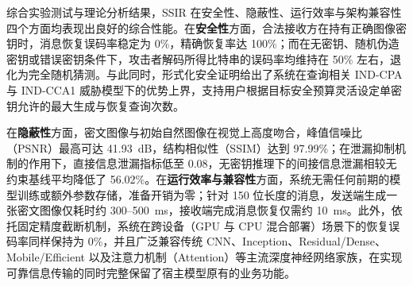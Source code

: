 综合实验测试与理论分析结果，SSIR 在安全性、隐蔽性、运行效率与架构兼容性四个方面均表现出良好的综合性能。在\textbf{安全性}方面，合法接收方在持有正确图像密钥时，消息恢复误码率稳定为 0\%，精确恢复率达 100\%；而在无密钥、随机伪造密钥或错误密钥条件下，攻击者解码所得比特串的误码率均维持在 50\% 左右，退化为完全随机猜测。与此同时，形式化安全证明给出了系统在查询相关 IND-CPA 与 IND-CCA1 威胁模型下的优势上界，支持用户根据目标安全预算灵活设定单密钥允许的最大生成与恢复查询次数。

在\textbf{隐蔽性}方面，密文图像与初始自然图像在视觉上高度吻合，峰值信噪比（PSNR）最高可达 41.93~dB，结构相似性（SSIM）达到 97.99\%；在泄漏抑制机制的作用下，直接信息泄漏指标低至 0.08，无密钥推理下的间接信息泄漏相较无约束基线平均降低了 56.02\%。在\textbf{运行效率与兼容性}方面，系统无需任何前期的模型训练或额外参数存储，准备开销为零；针对 150 位长度的消息，发送端生成一张密文图像仅耗时约 300--500~ms，接收端完成消息恢复仅需约 10~ms。此外，依托固定精度截断机制，系统在跨设备（GPU 与 CPU 混合部署）场景下的恢复误码率同样保持为 0\%，并且广泛兼容传统 CNN、Inception、Residual/Dense、Mobile/Efficient 以及注意力机制（Attention）等主流深度神经网络家族，在实现可靠信息传输的同时完整保留了宿主模型原有的业务功能。
